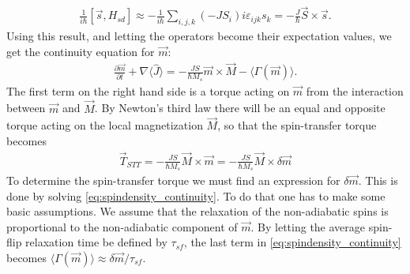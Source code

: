 \documentclass[12pt, a4paper]{article}		%
\numberwithin{equation}{section}
\begin{document}
\begin{align}
\frac{1}{i\hbar} \left[ \vec{s}, H_{sd} \right] \approx - \frac{1}{i\hbar} \sum_{i,j, k} (-J S_i) i\varepsilon_{ijk}  s_k = -\frac{J}{\hbar} \vec{S} \times \vec{s}.
\end{align}
Using this result, and letting the operators become their expectation values, we get the continuity equation for $\vec{m}$:
\begin{align}
\label{eq:spindensity_continuity}
\frac{\partial \vec{m}}{\partial t} + \nabla \langle\hat{J}\rangle = -\frac{J S}{\hbar M_s} \vec{m} \times \vec{M} - \langle\Gamma(\vec{m})\rangle.
\end{align}
The first term on the right hand side is a torque acting on $\vec{m}$ from the interaction between $\vec{m}$ and $\vec{M}$. By Newton's third law there will be an equal and opposite torque acting on the local magnetization $\vec{M}$, so that the spin-transfer torque becomes
\begin{align}
\label{eq:STT}
\vec{T}_{STT} = -\frac{J S}{\hbar M_s} \vec{M} \times \vec{m} = -\frac{J S}{\hbar M_s} \vec{M} \times \delta\vec{m}
\end{align}
To determine the spin-transfer torque we must find an expression for $\delta\vec{m}$. This is done by solving \eqref{eq:spindensity_continuity}. To do that one has to make some basic assumptions. We assume that the relaxation of the non-adiabatic spins is proportional to the non-adiabatic component of $\vec{m}$. By letting the average spin-flip relaxation time be defined by $\tau_{sf}$, the last term in \eqref{eq:spindensity_continuity} becomes $\langle\Gamma(\vec{m})\rangle \approx \delta\vec{m}/\tau_{sf}$. 
\end{document}
